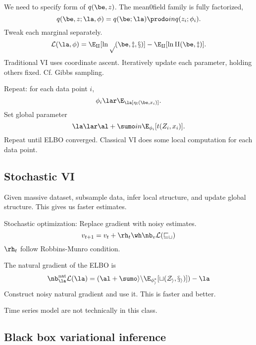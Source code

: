 We need to specify form of $q(\be,z)$. The mean0field family is fully factorized,
$$
q(\be, z;\la, \phi) = q(\be;\la) \prodo in q(z_i;\phi_i).
$$
Tweak each marginal separately.
$$
\cal L(\la,\phi) = \E_q[\ln p(\be, z, x)] - \E_q[\ln q(\be , z)].
$$
Traditional VI uses coordinate ascent.  Iteratively update each parameter, holding others fixed. Cf. Gibbs sampling.

Repeat: for each data point $i$,
$$
\phi_i \lar \E_\la [\eta_l(\be, x_i)].
$$
Set global parameter
$$
\la \lar \al + \sumo in \E_{\phi_i}[t(Z_i,x_i)].
$$
Repeat until ELBO converged.  Classical VI does some local computation for each data point.

\subsection{Stochastic VI}

Given massive dataset, subsample data, infer local structure, and update global structure. This gives us faster estimates.

Stochastic optimization: Replace gradient  with noisy estimates.
$$
v_{t+1} = v_t + \rh_t \wh\nb_v\cal L(v_t)
$$
$\rh_t$ follow Robbins-Munro condition.

The natural gradient of the ELBO is
$$
\nb_\la^{\text{nat}}\cal L(\la) = (\al + \sumo in \E_{\phi_i^*} [t(Z_i,x_i)]) - \la
$$
Construct noisy natural gradient and use it. This is faster and better.

Time series model are not technically in this class.


\subsection{Black box variational inference}

